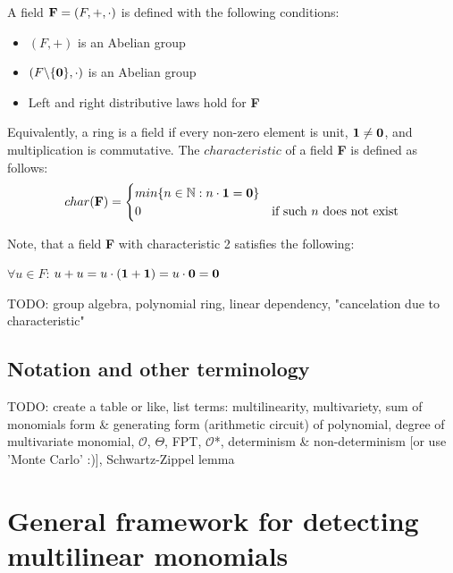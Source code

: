 A field $\textbf F = (F, +, \cdot)$ is defined with the following conditions:
\begin{itemize}
  \item $(F, +)$ is an Abelian group
  \item $(F\backslash \{\textbf 0\}, \cdot )$ is an Abelian group
  \item Left and right distributive laws hold for \textbf F
\end{itemize}

Equivalently, a ring is a field if every non-zero element is unit, $\textbf 1 \neq \textbf 0$, and multiplication is commutative. 
The $characteristic$ of a field \textbf F is defined as follows:
  \begin{equation}
    char(\textbf F) =
      \begin{cases}
        min\{n \in \mathbb N : n \cdot \textbf 1 = \textbf 0 \}\\
        0 & \text{if such $n$ does not exist}\\
      \end{cases}       
  \end{equation}

Note, that a field \textbf F with 
characteristic 2 satisfies the following:
\begin{center}
  $\forall u \in F$: $u + u = u \cdot (\textbf 1 + \textbf 1) = u \cdot \textbf 0 = \textbf 0$
\end{center}

TODO: group algebra, polynomial ring, linear dependency, "cancelation due to characteristic"

\subsection{Notation and other terminology} %
\label{sect:prelims_other}

TODO: create a table or like, list terms: 
multilinearity, multivariety, sum of monomials form \& generating form (arithmetic circuit) of polynomial, 
degree of multivariate monomial, $\mathcal{O}$, $\Theta$, FPT, $\mathcal{O}$*, determinism \& non-determinism [or use 'Monte Carlo' :)], 
Schwartz-Zippel lemma


\section{General framework for detecting multilinear monomials}

